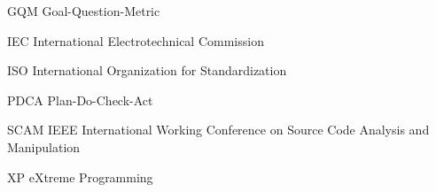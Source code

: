 \begin{siglas}
\item [GQM]  Goal-Question-Metric
\item [IEC]  International Electrotechnical Commission
\item [ISO]  International Organization for Standardization
\item [PDCA]  Plan-Do-Check-Act
\item[SCAM]  IEEE International Working Conference on Source Code Analysis and Manipulation
\item[XP]     eXtreme Programming
  
\end{siglas}
